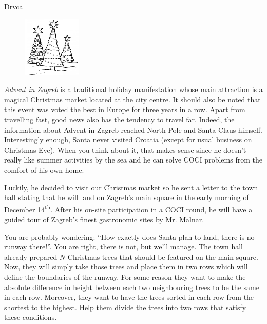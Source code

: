 \begin{statement}[
  problempoints=110,
  timelimit=1 second,
  memorylimit=512 MiB,
]{Drvca}

\setlength\intextsep{-0.1cm}
\begin{figure}
\centering
\includegraphics[width=0.25\textwidth]{img/drvca.png}
\end{figure}

\textit{Advent in Zagreb} is a traditional holiday manifestation whose main
attraction is a magical Christmas market located at the city centre. It
should also be noted that this event was voted the best in Europe for three
years in a row. Apart from travelling fast, good news also has the tendency
to travel far. Indeed, the information about Advent in Zagreb reached North
Pole and Santa Claus himself. Interestingly enough, Santa never visited
Croatia (except for usual business on Christmas Eve). When you think about
it, that makes sense since he doesn't really like summer activities by the
sea and he can solve COCI problems from the comfort of his own home.

Luckily, he decided to visit our Christmas market so he sent a letter to the
town hall stating that he will land on Zagreb's main square in the early morning
of December 14\textsuperscript{th}. After his on-site participation in a COCI round, he
will have a guided tour of Zagreb's finest gastronomic sites by Mr. Malnar.

You are probably wondering: ``How exactly does Santa plan to land, there is no
runway there!''. You are right, there is not, but we'll manage. The town hall
already prepared $N$ Christmas trees that should be featured on the main square.
Now, they will simply take those trees and place them in two rows which will
define the boundaries of the runway. For some reason they want to make the
absolute difference in height between each two neighbouring trees to be the
same in each row. Moreover, they want to have the trees sorted in each row from
the shortest to the highest. Help them divide the trees into two rows that
satisfy these conditions.


\end{statement}
